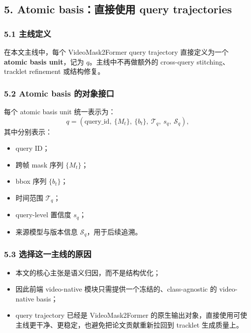 \documentclass[UTF8]{ctexart}
\begin{document}
\par\noindent\hrulefill\par

\subsection*{5. Atomic basis：直接使用 query trajectories}

\subsubsection*{5.1 主线定义}
在本文主线中，每个 VideoMask2Former query trajectory 直接定义为一个 \textbf{atomic basis unit}，记为 $q$。主线中不再做额外的 cross-query stitching、tracklet refinement 或结构修复。

\subsubsection*{5.2 Atomic basis 的对象接口}
每个 atomic basis unit 统一表示为：
\[
 q = (\mathrm{query\_id},\ \{M_t\},\ \{b_t\},\ \mathcal T_q,\ s_q,\ \mathcal S_q),
\]
其中分别表示：
\begin{itemize}
\item query ID；
\item 跨帧 mask 序列 $\{M_t\}$；
\item bbox 序列 $\{b_t\}$；
\item 时间范围 $\mathcal T_q$；
\item query-level 置信度 $s_q$；
\item 来源模型与版本信息 $\mathcal S_q$，用于后续追溯。
\end{itemize}

\subsubsection*{5.3 选择这一主线的原因}
\begin{itemize}
\item 本文的核心主张是语义归因，而不是结构优化；
\item 因此前端 video-native 模块只需提供一个冻结的、class-agnostic 的 video-native basis；
\item query trajectory 已经是 VideoMask2Former 的原生输出对象，直接使用可使主线更干净、更稳定，也避免把论文贡献重新拉回到 tracklet 生成质量上。
\end{itemize}

\par\noindent\hrulefill\par
\end{document}

